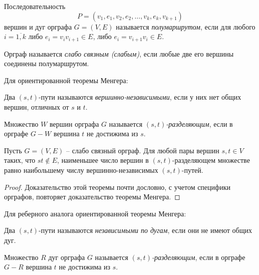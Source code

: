 \begin{definition}[Полумаршрут]
    Последовательность
    \[
        P = (v_1,e_1,v_2,e_2,\ldots,v_k,e_k,v_{k+1})
    \]
    вершин и дуг орграфа $ G = (V,E) $ называется \emph{полумаршрутом}, если для любого $ i = \overline{1,k} $ либо $ e_i = v_iv_{i+1}\in E $, либо $ e_i = v_{i+1}v_i \in E $.
\end{definition}

\begin{definition}
    Орграф называется \emph{слабо связным (слабым)}, если любые две его вершины соединены полумаршрутом.
\end{definition}

\newpage

\begin{note} Для ориентированной теоремы Менгера:
    \begin{definition}
        Два $ (s,t) $-пути называются \emph{вершинно-независимыми}, если у них нет общих вершин, отличных от $ s $ и $ t $.
    \end{definition}

    \begin{definition}
        Множество $ W $ вершин орграфа $ G $ называется \emph{$ (s,t) $-разделяющим}, если в орграфе $ G-W $ вершина $ t $ не достижима из $ s $.
    \end{definition}
\end{note}

\begin{theorem}
    Пусть $ G = (V,E) $ -- слабо связный орграф. Для любой пары вершин $ s,t \in V $ таких, что $ st \notin E $, наименьшее число вершин в $ (s,t) $-разделяющем множестве равно наибольшему числу вершинно-независимых $ (s,t) $-путей.
\end{theorem}

\begin{proof}
    Доказательство этой теоремы почти дословно, с учетом специфики орграфов, повторяет доказательство теоремы Менгера.
\end{proof}

\begin{note} Для реберного аналога ориентированной теоремы Менгера:
    \begin{definition}
        Два $ (s,t) $-пути называются \emph{независимыми по дугам}, если они не имеют общих дуг.
    \end{definition}

    \begin{definition}
        Множество $ R $ дуг орграфа $ G $ называется \emph{$ (s,t) $-разделяющим}, если в орграфе $ G - R $ вершина $ t $ не достижима из $ s $.
    \end{definition}
\end{note}

